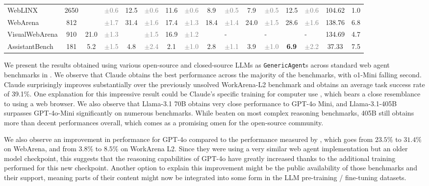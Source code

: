 \documentclass[10pt]{article} %
\newcommand{\std}[1]{\textcolor{gray}{\tiny{$\pm$#1}}}
\newcommand{\code}[1]{\texttt{#1}}
\begin{document}
\begin{table}[b]
\begin{tabular}{@{}l|S[table-format=4]|S@{}lS@{}lS@{}lS@{}lS@{}lS@{}l|S[table-format=3.2]S@{}}
WebLINX        & 2650 &  & \std{0.6}  & 12.5 & \std{0.6} & 11.6 & \std{0.6} & 8.9  & \std{0.5} & 7.9  & \std{0.5} & 12.5         & \std{0.6} & 104.62 & 1.0  \\
WebArena       & 812  &  & \std{1.7}  & 31.4 & \std{1.6} & 17.4 & \std{1.3} & 18.4 & \std{1.4} & 24.0 & \std{1.5} & 28.6         & \std{1.6} & 138.76 & 6.8  \\
VisualWebArena & 910  & 21.0 & \std{1.3} &  & \std{1.5} & 16.9 & \std{1.2} &  & - &  & - &  & - & 134.69 & 4.7 \\
AssistantBench & 181  & 5.2     & \std{1.5}  & 4.8  & \std{2.4} & 2.1  & \std{1.0} & 2.8  & \std{1.1} & 3.9  & \std{1.0} & \textbf{6.9} & \std{2.2} & 37.33  & 7.5  \\
\bottomrule
\end{tabular}
\end{table}

We present the results obtained using various open-source and closed-source LLMs as \code{GenericAgent}s across standard web agent benchmarks in . We observe that Claude obtains the best performance across the majority of the benchmarks, with o1-Mini falling second. Claude surprisingly improves substantially over the previously unsolved WorkArena-L2 benchmark and obtains an average task success rate of 39.1\%. One explanation for this impressive result could be Claude's specific training for computer use \citep{claude-computer-use}, which bears a close resemblance to using a web browser. We also observe that Llama-3.1 70B obtains very close performance to GPT-4o Mini, and Llama-3.1-405B surpasses GPT-4o-Mini significantly on numerous benchmarks. While beaten on most complex reasoning benchmarks, 405B still obtains more than decent performances overall, which comes as a promising omen for the open-source community.

We also observe an improvement in performance for GPT-4o compared to the performance measured by \citet{workarena-plus-plus}, which goes from $23.5\%$ to $31.4\%$ on WebArena, and from $3.8\%$ to $8.5\%$ on WorkArena L2. Since they were using a very similar web agent implementation but an older model checkpoint, this suggests that the reasoning capabilities of GPT-4o have greatly increased thanks to the additional training performed for this new checkpoint. Another option to explain this improvement might be the public availability of those benchmarks and their support, meaning parts of their content might now be integrated into some form in the LLM pre-training / fine-tuning datasets.
\end{document}
